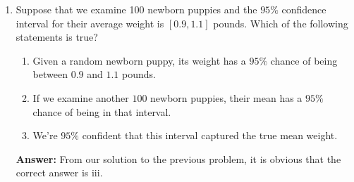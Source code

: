 \documentclass{article}
\newenvironment{QandA}{\begin{enumerate}[label=\arabic*.]}{\end{enumerate}}
\newenvironment{InnerQandA}{\begin{enumerate}[label=\roman*.]}{\end{enumerate}}
\newenvironment{answer}{\par\normalfont \textbf{Answer:}}{}
\newcommand{\Exp}[1]{\mathbb{E}\left[ #1 \right]}
\newcommand{\Vari}[1]{\text{Var}\left[ #1 \right]}
\begin{document}
\begin{QandA}
\begin{answer}
\begin{align*}
            &= \frac{\sigma^2}{n}
        \end{align*}
        Moreover, due to the Central Limit Theorem (CLT), the estimator $\bar{X}_n$ has approximately normal distribution. Therefore, the following derive random variable:
        \begin{align*}
            \frac{\bar{X}_n - \Exp{\bar{X}_n}}{\sqrt{\Vari{\bar{X}_n}}} = \frac{\bar{X}_n - \mu}{\sigma / \sqrt{n}} \sim N(0, 1)
        \end{align*}
        is approximately distributed as a Standard Normal variable. \\\\
        Coming back to our example, let us first note that we don't have the true population standard deviation $\sigma$. Therefore, we need to plug in a proxy -- the sample standard deviation $s$. As a rule of thumb, as long as the number of samples $n$ is larger than $50$, we can make this substitution. \\\\
        Now, by looking up the z-table, we obtain:
        \begin{align*}
            P \left( -1.96 \le \frac{\bar{X}_n - \mu}{s / \sqrt{n}} \le 1.96 \right) \approx 95 \%
        \end{align*}
        Finally, let us plug in the numbers:
        \begin{align*}
            P \left(-1.96 \le \frac{\bar{X}_n - \mu}{s / \sqrt{n}} \le 1.96 \right) &\approx 95 \%  \\
            P \left(\bar{X}_n - 1.96 \cdot \frac{s}{\sqrt{n}} \le \mu \le \bar{X}_n + 1.96 \cdot \frac{s}{\sqrt{n}} \right) &\approx 95 \% \\
            P \left(1 - 1.96 \cdot \frac{0.12}{\sqrt{100}} \le \mu \le 1 + 1.96 \cdot \frac{0.12}{\sqrt{100}} \right) &\approx 95 \% \\
            P \left(0.97648 \le \mu \le 1.02352 \right) &\approx 95 \%
        \end{align*}
    \end{answer}

    \item Suppose that we examine 100 newborn puppies and the $95\%$ confidence interval for their average weight is  $[0.9,1.1]$  pounds. Which of the following statements is true?
    \begin{InnerQandA}
        \item Given a random newborn puppy, its weight has a $95\%$ chance of being between $0.9$ and $1.1$ pounds.
        \item If we examine another $100$ newborn puppies, their mean has a $95\%$ chance of being in that interval. 
        \item We're $95\%$ confident that this interval captured the true mean weight.
    \end{InnerQandA}
    \begin{answer}
        From our solution to the previous problem, it is obvious that the correct answer is iii.
    \end{answer}


\end{QandA}
\end{document}
